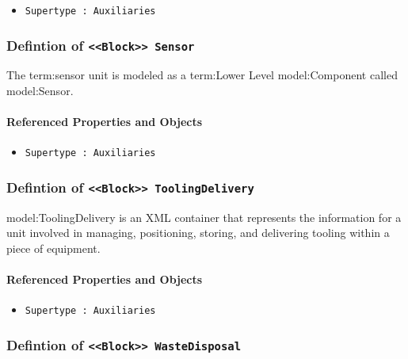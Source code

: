 \begin{itemize}
\item \texttt{Supertype : Auxiliaries}

\end{itemize}
\FloatBarrier
\subsubsection{Defintion of \texttt{<<Block>> Sensor}}
  \label{type:Sensor}

\FloatBarrier

The {term:sensor unit} is modeled as a {term:Lower Level} {model:Component} called {model:Sensor}.

\FloatBarrier
\paragraph{Referenced Properties and Objects}

\begin{itemize}
\item \texttt{Supertype : Auxiliaries}

\end{itemize}
\FloatBarrier
\subsubsection{Defintion of \texttt{<<Block>> ToolingDelivery}}
  \label{type:ToolingDelivery}

\FloatBarrier

{model:ToolingDelivery} is an XML container that represents the information for a unit involved in managing, positioning, storing, and delivering tooling within a piece of equipment.


\FloatBarrier
\paragraph{Referenced Properties and Objects}

\begin{itemize}
\item \texttt{Supertype : Auxiliaries}

\end{itemize}
\FloatBarrier
\subsubsection{Defintion of \texttt{<<Block>> WasteDisposal}}
  \label{type:WasteDisposal}

\FloatBarrier


